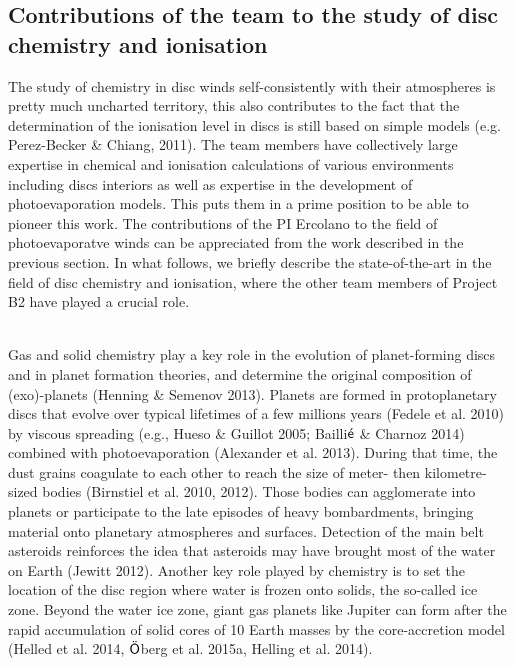 \documentclass[10pt,fleqn,twoside]{article}
\newcommand{\Tcol}{\color{blue}}
\begin{document}
\subsection{\Tcol Contributions of the team to the study of disc chemistry and ionisation}
The study of chemistry in disc winds self-consistently with their
atmospheres is pretty much uncharted territory, this also contributes
to the fact that the determination of the ionisation level in discs is
still based on simple models (e.g. Perez-Becker \& Chiang, 2011). The
team members have collectively large expertise in chemical and ionisation
calculations of various environments including discs interiors as well
as expertise in the development of photoevaporation models. This puts
them in a prime position to be able to pioneer this work. The
contributions of the PI Ercolano to the field of photoevaporatve winds
can be appreciated from the work described in the previous section. In what
follows, we briefly describe the state-of-the-art in the field of disc
chemistry and ionisation, where the other team members of Project B2 have played
a crucial role.  

\vspace{0.5em}\noindent{\Tcol\bf Chemical models of protoplanetary discs}\\
Gas and solid chemistry play a key role in the evolution of planet-forming discs and in planet formation theories, and determine the original composition of (exo)-planets (Henning \& Semenov 2013).  Planets are formed in protoplanetary discs that evolve over typical lifetimes of a few millions years (Fedele et al. 2010) by viscous spreading (e.g., Hueso \& Guillot 2005; Bailli$\acute{\textsf e}$ \& Charnoz 2014) combined with photoevaporation (Alexander et al. 2013). During that time, the dust grains coagulate to each other to reach the size of meter- then kilometre- sized bodies (Birnstiel et al. 2010, 2012). Those bodies can agglomerate into planets or participate to the late episodes of heavy bombardments, bringing material onto planetary atmospheres and surfaces. Detection of the main belt asteroids reinforces the idea that asteroids may have brought most of the water on Earth (Jewitt 2012). Another key role played by chemistry is to set the location of the disc region where water is frozen onto solids, the so-called ice zone. Beyond the water ice zone, giant gas planets like Jupiter can form after the rapid accumulation of solid cores of 10 Earth masses by the core-accretion model (Helled et al. 2014, $\ddot{\textsf O}$berg et al. 2015a, Helling et al. 2014).
\end{document}
